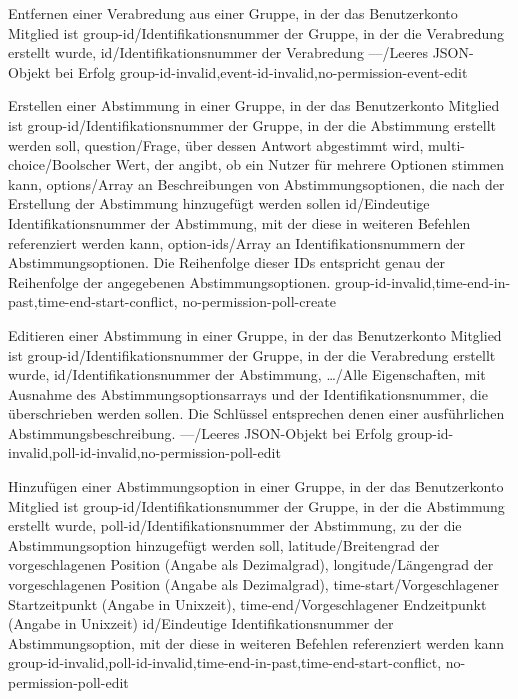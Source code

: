 \documentclass[parskip=full,11pt]{scrartcl}
\begin{document}
{Entfernen einer Verabredung aus einer Gruppe, in der das Benutzerkonto
Mitglied ist}
{group-id/Identifikationsnummer der Gruppe{,} in der die Verabredung erstellt
wurde,
id/Identifikationsnummer der Verabredung}
{---/Leeres JSON-Objekt bei Erfolg}
{group-id-invalid,event-id-invalid,no-permission-event-edit}

{Erstellen einer Abstimmung in einer Gruppe, in der das Benutzerkonto Mitglied
ist}
{group-id/Identifikationsnummer der Gruppe{,} in der die Abstimmung erstellt
werden soll,
question/Frage{,} über dessen Antwort abgestimmt wird,
multi-choice/Boolscher Wert{,} der angibt{,} ob ein Nutzer für mehrere
Optionen stimmen kann,
options/Array an Beschreibungen von Abstimmungsoptionen{,} die nach der
Erstellung der Abstimmung hinzugefügt werden sollen}
{id/Eindeutige Identifikationsnummer der Abstimmung{,} mit der diese in
weiteren Befehlen referenziert werden kann,
option-ids/Array an Identifikationsnummern der Abstimmungsoptionen. Die
Reihenfolge dieser IDs entspricht genau der Reihenfolge der angegebenen
Abstimmungsoptionen.}
{group-id-invalid,time-end-in-past,time-end-start-conflict,
no-permission-poll-create}

{Editieren einer Abstimmung in einer Gruppe, in der das Benutzerkonto Mitglied
ist}
{group-id/Identifikationsnummer der Gruppe{,} in der die Verabredung erstellt
wurde,
id/Identifikationsnummer der Abstimmung,
\dots/Alle Eigenschaften{,} mit Ausnahme des Abstimmungsoptionsarrays und der
Identifikationsnummer{,} die überschrieben werden sollen.
Die Schlüssel entsprechen denen einer ausführlichen Abstimmungsbeschreibung.}
{---/Leeres JSON-Objekt bei Erfolg}
{group-id-invalid,poll-id-invalid,no-permission-poll-edit}

{Hinzufügen einer Abstimmungsoption in einer Gruppe, in der das Benutzerkonto
Mitglied ist}
{group-id/Identifikationsnummer der Gruppe{,} in der die Abstimmung erstellt
wurde,
poll-id/Identifikationsnummer der Abstimmung{,} zu der die Abstimmungsoption
hinzugefügt werden soll,
latitude/Breitengrad der vorgeschlagenen Position (Angabe als Dezimalgrad),
longitude/Längengrad der vorgeschlagenen Position (Angabe als Dezimalgrad),
time-start/Vorgeschlagener Startzeitpunkt (Angabe in Unixzeit),
time-end/Vorgeschlagener Endzeitpunkt (Angabe in Unixzeit)}
{id/Eindeutige Identifikationsnummer der Abstimmungsoption{,} mit der diese in
weiteren Befehlen referenziert werden kann}
{group-id-invalid,poll-id-invalid,time-end-in-past,time-end-start-conflict,
no-permission-poll-edit}
\end{document}
